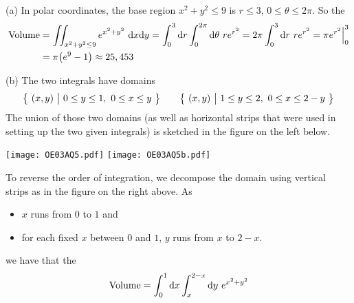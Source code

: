 \begin{solution}
(a) In polar coordinates, the base region $x^2+y^2\le 9$ is $r\le 3$,
$0\le\theta\le 2\pi$. So the
\begin{align*}
\text{Volume}
&=\iint_{x^2+y^2\le 9} e^{x^2+y^2}\ \mathrm{d}x\mathrm{d}y
=\int_0^3 \mathrm{d}r\int_0^{2\pi}\mathrm{d}\theta\ r e^{r^2}
=2\pi\int_0^3\mathrm{d}r\ r e^{r^2}
=\pi e^{r^2}\Big|_0^3 \\
&=\pi\big(e^9-1\big)\approx 25,453
\end{align*}

(b) The two integrals have domains
\begin{align*}
\big\{ \ (x,y)\ \big|\ 0\le y\le 1,\ 0\le x\le y\ \big\}\qquad
\big\{ \ (x,y)\ \big|\ 1\le y\le 2,\ 0\le x\le 2-y\ \big\}
\end{align*}
The union of those two domains (as well as horizontal strips that were used in
setting up the two given integrals) is sketched in the figure on the left below.
\begin{center}
     \texttt{[image: OE03AQ5.pdf]}\qquad
     \texttt{[image: OE03AQ5b.pdf]}
\end{center}
To reverse the order of integration, we decompose the domain using vertical
strips as in the figure on the right above. As
\begin{itemize}
\item
$x$ runs from $0$ to $1$ and
\item
for each fixed $x$ between $0$ and $1$, $y$ runs from $x$ to $2-x$.
\end{itemize}
we have that the
\begin{equation*}
\text{Volume}=\int_0^1 \mathrm{d}x\int_x^{2-x}\mathrm{d}y\ e^{x^2+y^2}
\end{equation*}
\end{solution}

